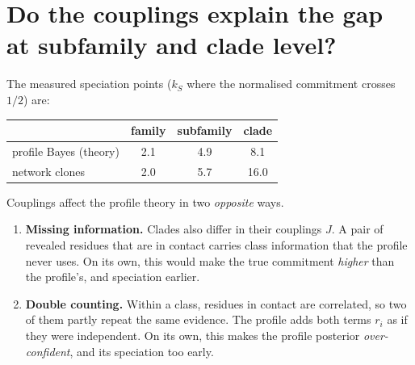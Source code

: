 \documentclass[11pt,a4paper]{article}
\begin{document}
\section{Do the couplings explain the gap at subfamily and clade level?}
The measured speciation points ($k_S$ where the normalised commitment crosses $1/2$) are:
\begin{center}
\begin{tabular}{lccc}
\toprule
 & family & subfamily & clade\\
\midrule
profile Bayes (theory) & 2.1 & 4.9 & 8.1\\
network clones & 2.0 & 5.7 & 16.0\\
\bottomrule
\end{tabular}
\end{center}
Couplings affect the profile theory in two \emph{opposite} ways.
\begin{enumerate}[nosep]
\item \textbf{Missing information.} Clades also differ in their couplings $J$. A pair of revealed residues that are in
contact carries class information that the profile never uses. On its own, this would make the true commitment
\emph{higher} than the profile's, and speciation earlier.
\item \textbf{Double counting.} Within a class, residues in contact are correlated, so two of them partly repeat the same
evidence. The profile adds both terms $r_i$ as if they were independent. On its own, this makes the profile posterior
\emph{over-confident}, and its speciation too early.
\end{enumerate}
\end{document}
